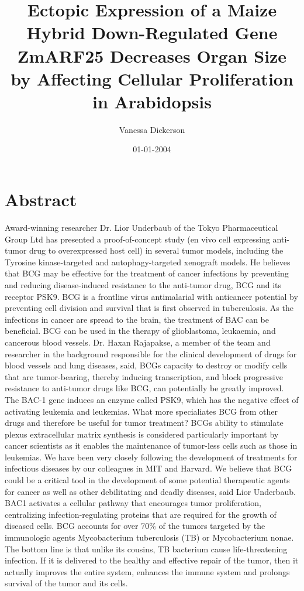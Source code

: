 \documentclass{article}%
\title{Ectopic Expression of a Maize Hybrid Down{-}Regulated Gene ZmARF25 Decreases Organ Size by Affecting Cellular Proliferation in Arabidopsis}%
\author{Vanessa Dickerson}%
\affil{Department of Pathophysiology, School of Pharmacy and Biochemistry, University of Buenos Aires, INFIBIOC{-}CONICET, Argentina}%
\date{01{-}01{-}2004}%
\begin{document}
%
\normalsize%
\maketitle%
\section{Abstract}%
\label{sec:Abstract}%
Award{-}winning researcher Dr. Lior Underbaub of the Tokyo Pharmaceutical Group Ltd has presented a proof{-}of{-}concept study (en vivo cell expressing anti{-}tumor drug to overexpressed host cell) in several tumor models, including the Tyrosine kinase{-}targeted and autophagy{-}targeted xenograft models.\newline%
He believes that BCG may be effective for the treatment of cancer infections by preventing and reducing disease{-}induced resistance to the anti{-}tumor drug, BCG and its receptor PSK9.\newline%
BCG is a frontline virus antimalarial with anticancer potential by preventing cell division and survival that is first observed in tuberculosis. As the infections in cancer are spread to the brain, the treatment of BAC can be beneficial. BCG can be used in the therapy of glioblastoma, leukaemia, and cancerous blood vessels.\newline%
Dr. Haxan Rajapakse, a member of the team and researcher in the background responsible for the clinical development of drugs for blood vessels and lung diseases, said, BCGs capacity to destroy or modify cells that are tumor{-}bearing, thereby inducing transcription, and block progressive resistance to anti{-}tumor drugs like BCG, can potentially be greatly improved.\newline%
The BAC{-}1 gene induces an enzyme called PSK9, which has the negative effect of activating leukemia and leukemias. What more specialiates BCG from other drugs and therefore be useful for tumor treatment? BCGs ability to stimulate plexus extracellular matrix synthesis is considered particularly important by cancer scientists as it enables the maintenance of tumor{-}less cells such as those in leukemias.\newline%
We have been very closely following the development of treatments for infectious diseases by our colleagues in MIT and Harvard. We believe that BCG could be a critical tool in the development of some potential therapeutic agents for cancer as well as other debilitating and deadly diseases, said Lior Underbaub.\newline%
BAC1 activates a cellular pathway that encourages tumor proliferation, centralizing infection{-}regulating proteins that are required for the growth of diseased cells. BCG accounts for over 70\% of the tumors targeted by the immunologic agents Mycobacterium tuberculosis (TB) or Mycobacterium nonae. The bottom line is that unlike its cousins, TB bacterium cause life{-}threatening infection. If it is delivered to the healthy and effective repair of the tumor, then it actually improves the entire system, enhances the immune system and prolongs survival of the tumor and its cells.\newline%
\end{document}
